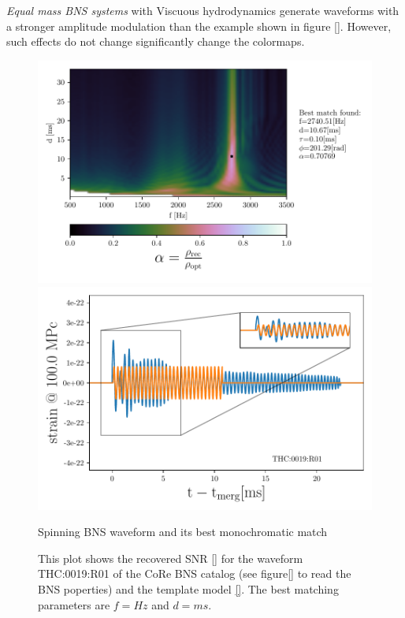 \FloatBarrier


\textit{Equal mass BNS systems} with Viscuous hydrodynamics generate waveforms with a stronger amplitude modulation than the example shown in figure \ref{}. However, such effects do not change significantly change the colormaps.

\begin{figure}[!htbp]
\begin{center}
\begin{minipage}[t]{0.5\linewidth}
\vspace{0pt}
\includegraphics[scale=0.6,trim={2mm 0 35mm 0},clip]{images/Data_analysis/results/2D_grid_11.pdf}
\end{minipage}%
\begin{minipage}[t]{0.5\linewidth}
\vspace{20pt}
\includegraphics[scale=0.45]{images/Data_analysis/results/2D_grid_12.pdf}
\end{minipage}
\captionsetup{width=0.8\textwidth}
\caption{Spinning BNS waveform and its best monochromatic match}
\caption*{This plot shows the recovered SNR \ref{} for the waveform THC:0019:R01 of the CoRe BNS catalog \cite{}(see figure\ref{} to read the BNS poperties) and the template model \ref{}. The best matching parameters are $f=Hz$ and $d=ms$.}
\end{center}
\end{figure}

